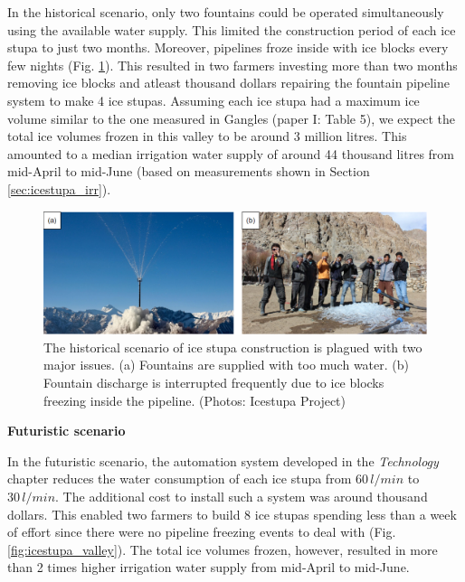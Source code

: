In the historical scenario, only two fountains could be operated simultaneously using the available water
supply. This limited the construction period of each ice stupa to just two months. Moreover, pipelines froze
inside with ice blocks every few nights (Fig. \ref{fig:issues}). This resulted in two farmers investing more
than two months removing ice blocks and atleast thousand dollars repairing the fountain pipeline system to make
4 ice stupas. Assuming each ice stupa had a maximum ice volume similar to the one measured in Gangles (paper I:
Table 5), we expect the total ice volumes frozen in this valley to be around 3 million litres. This amounted to
a median irrigation water supply of around 44 thousand litres from mid-April to mid-June (based on measurements
shown in Section \ref{sec:icestupa_irr}).   

\begin{figure}[htb]
	\includegraphics[width=\textwidth]{figs/construction_issues}

  \caption{The historical scenario of ice stupa construction is plagued with two major issues. (a) Fountains are
  supplied with too much water. (b) Fountain discharge is interrupted frequently due to ice blocks freezing
  inside the pipeline. (Photos: Icestupa Project)}

	\label{fig:issues}
\end{figure}

\textbf{Futuristic scenario}

In the futuristic scenario, the automation system developed in the \textit{Technology} chapter reduces the water
consumption of each ice stupa from $60\,l/min$ to $30\,l/min$. The additional cost to install such a system was
around thousand dollars. This enabled two farmers to build 8 ice stupas spending less than a week of effort
since there were no pipeline freezing events to deal with (Fig. \ref{fig:icestupa_valley}). The total ice
volumes frozen, however, resulted in more than 2 times higher irrigation water supply from mid-April to
mid-June.

